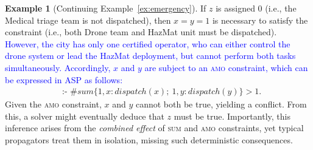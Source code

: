 \documentclass[preprint,authoryear]{elsarticle}
\theoremstyle{definition}
\newtheorem{example}{Example}[section]
\begin{document}
%
\begin{example}[Continuing Example~\ref{ex:emergency}]\label{ex:emergency:amo}
If $z$ is assigned $0$ (i.e., the Medical triage team is not dispatched), then $x = y = 1$ is necessary to satisfy the constraint (i.e., both Drone team and HazMat unit must be dispatched).
\textcolor{blue}{However, the city has only one certified operator, who can either control the drone system or lead the HazMat deployment, but cannot perform both tasks simultaneously.
Accordingly, $x$ and $y$ are subject to an \textsc{amo} constraint, which can be expressed in ASP as follows:}
\begin{align*}
    & \text{:- } \#\mathit{sum}\{1,x : \mathit{dispatch}(x);\ 1,y : \mathit{dispatch}(y)\} > 1.
\end{align*}
Given the \textsc{amo} constraint, $x$ and $y$ cannot both be true, yielding a conflict.
From this, a solver might eventually deduce that $z$ must be true.
Importantly, this inference arises from the \emph{combined effect} of \textsc{sum} and \textsc{amo} constraints, yet typical propagators treat them in isolation, missing such deterministic consequences.
\end{example}

\end{document}
